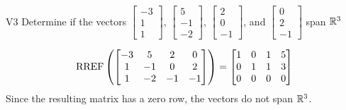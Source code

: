 \begin{problem}{V3}
Determine if the vectors  \(\begin{bmatrix} -3 \\ 1 \\ 1 \end{bmatrix}\), \(\begin{bmatrix} 5 \\ -1 \\ -2 \end{bmatrix}\), \(\begin{bmatrix}2 \\ 0 \\ -1 \end{bmatrix}\), and \(\begin{bmatrix} 0 \\ 2 \\ -1\end{bmatrix}\) span \(\mathbb{R}^3\)
\end{problem}
\begin{solution}
\[\operatorname{RREF}\left(\begin{bmatrix}
-3 & 5 & 2 & 0 \\ 1 & -1 & 0 & 2 \\ 1 & -2 & -1 & -1 \end{bmatrix}\right)=\begin{bmatrix} 1 & 0 & 1 & 5 \\ 0 & 1 & 1 & 3 \\ 0 & 0 & 0 & 0\end{bmatrix}\]
Since the resulting matrix has a zero row, the vectors do not span \(\mathbb{R}^3\).
\end{solution}


